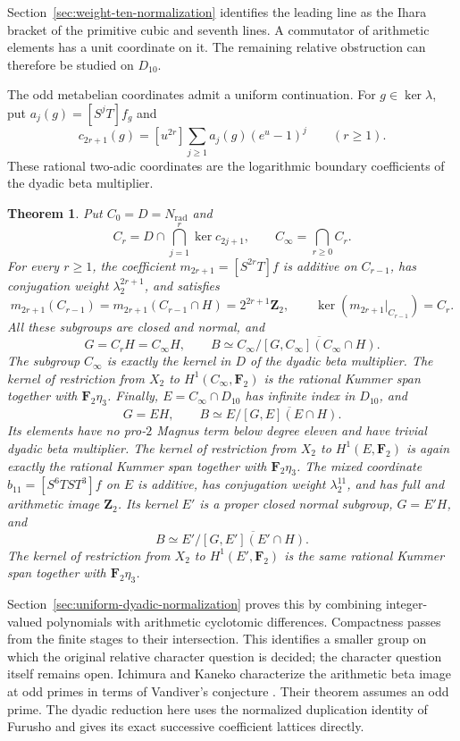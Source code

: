 \documentclass[11pt,a4paper]{article}
\newtheorem{theorem}{Theorem}[section]
\theoremstyle{definition}
\theoremstyle{remark}
\newcommand{\Z}{\mathbf Z}
\newcommand{\F}{\mathbf F}
\begin{document}
Section~\ref{sec:weight-ten-normalization} identifies the leading
line as the Ihara bracket of the primitive cubic and seventh
lines. A commutator of arithmetic elements has a unit coordinate
on it. The remaining relative obstruction can therefore be studied
on $D_{10}$.

The odd metabelian coordinates admit a uniform continuation. For
$g\in\ker\lambda$, put $a_j(g)=[S^jT]f_g$ and
\[
 c_{2r+1}(g)=[u^{2r}]\sum_{j\ge1}a_j(g)(e^u-1)^j
 \qquad(r\ge1).
\]
These rational two-adic coordinates are the logarithmic boundary
coefficients of the dyadic beta multiplier.

\begin{theorem}\label{thm:main-uniform-dyadic-normalization}
Put $C_0=D=N_{\mathrm{rad}}$ and
\[
 C_r=D\cap\bigcap_{j=1}^r\ker c_{2j+1},\qquad
 C_\infty=\bigcap_{r\ge0}C_r.
\]
For every $r\ge1$, the coefficient
$m_{2r+1}=[S^{2r}T]f$ is additive on $C_{r-1}$, has conjugation
weight $\lambda_2^{2r+1}$, and satisfies
\[
 m_{2r+1}(C_{r-1})=m_{2r+1}(C_{r-1}\cap H)
                     =2^{2r+1}\Z_2,\qquad
 \ker(m_{2r+1}|_{C_{r-1}})=C_r.
\]
All these subgroups are closed and normal, and
\[
 G=C_rH=C_\infty H,\qquad
 B\simeq C_\infty/
       \overline{[G,C_\infty](C_\infty\cap H)}.
\]
The subgroup $C_\infty$ is exactly the kernel in $D$ of the dyadic
beta multiplier. The kernel of restriction from $X_2$ to
$H^1(C_\infty,\F_2)$ is the rational Kummer span together with
$\F_2\eta_3$.
Finally, $E=C_\infty\cap D_{10}$ has infinite index in $D_{10}$,
and
\[
 G=EH,\qquad B\simeq E/\overline{[G,E](E\cap H)}.
\]
Its elements have no pro-$2$ Magnus term below degree eleven and
have trivial dyadic beta multiplier. The kernel of restriction
from $X_2$ to $H^1(E,\F_2)$ is again exactly the rational Kummer
span together with $\F_2\eta_3$.
The mixed coordinate $b_{11}=[S^6TST^3]f$ on $E$ is additive,
has conjugation weight $\lambda_2^{11}$, and has full and arithmetic
image $\Z_2$. Its kernel $E'$ is a proper closed normal subgroup,
$G=E'H$, and
\[
 B\simeq E'/\overline{[G,E'](E'\cap H)}.
\]
The kernel of restriction from $X_2$ to $H^1(E',\F_2)$ is the
same rational Kummer span together with $\F_2\eta_3$.
\end{theorem}

Section~\ref{sec:uniform-dyadic-normalization} proves this by combining
integer-valued polynomials with arithmetic cyclotomic differences.
Compactness passes from the finite stages to their intersection.
This identifies a smaller group on which the original relative
character question is decided; the character question itself remains
open. Ichimura and Kaneko characterize the arithmetic beta image at
odd primes in terms of Vandiver's conjecture
\cite[Section~1.2, pp.~314--315, Theorem~1]{IchimuraKaneko1989}.
Their theorem assumes an odd prime. The dyadic reduction here uses
the normalized duplication identity of Furusho and gives its exact
successive coefficient lattices directly.
\end{document}
